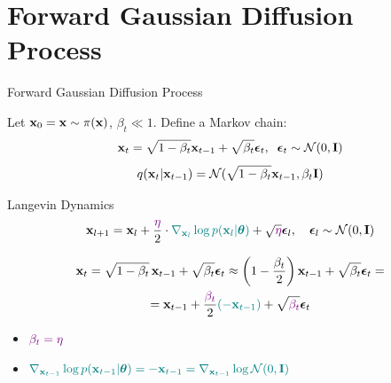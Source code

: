 \documentclass{beamer}
\begin{document}
\section{Forward Gaussian Diffusion Process}
\begin{frame}{Forward Gaussian Diffusion Process}

	Let $\mathbf{x}_0 = \mathbf{x} \sim \pi(\mathbf{x})$, $\beta_t \ll 1$. Define a Markov chain:
	\[
		\mathbf{x}_t = \sqrt{1 - \beta_t} \mathbf{x}_{t-1} + \sqrt{\beta_t} \boldsymbol{\epsilon}_t, \;\; \boldsymbol{\epsilon}_t \sim \mathcal{N}(0, \mathbf{I})
	\]
	\vspace{-0.5cm}
    \eqpause
	\[
		q(\mathbf{x}_t | \mathbf{x}_{t-1}) = \mathcal{N}(\sqrt{1 - \beta_t} \mathbf{x}_{t-1}, \beta_t \mathbf{I})
	\]
    \eqpause
	\vspace{-0.5cm}
	\begin{block}{Langevin Dynamics}
		\vspace{-0.3cm}
		\[
			\mathbf{x}_{l + 1} = \mathbf{x}_l + \frac{ \color{violet} \eta}{2} \cdot {\color{teal}\nabla_{\mathbf{x}_l} \log p(\mathbf{x}_l | \boldsymbol{\theta})} + \sqrt{ \color{violet} \eta} \boldsymbol{\epsilon}_l, \quad \boldsymbol{\epsilon}_l \sim \mathcal{N}(0, \mathbf{I})
		\]
		\vspace{-0.5cm}
	\end{block}
    \eqpause
	\vspace{-0.7cm}
	\begin{multline*}
		\mathbf{x}_t = \sqrt{1 - \beta_t}\, \mathbf{x}_{t - 1} + \sqrt{\beta_t} \boldsymbol{\epsilon}_t \approx \left(1 - \frac{\beta_t}{2}\right)\mathbf{x}_{t-1} + \sqrt{\beta_t} \boldsymbol{\epsilon}_t = \\
		= \mathbf{x}_{t-1} + \frac{ \color{violet}  \beta_t}{2} {\color{teal} ( -\mathbf{x}_{t-1} )} + \sqrt{ \color{violet}  \beta_t} \boldsymbol{\epsilon}_t
	\end{multline*}
    \eqpause
	\vspace{-0.7cm}
	\begin{itemize}
		\item ${\color{violet} \beta_t = \eta }$
		\item ${\color{teal} \nabla_{\mathbf{x}_{t-1}}\log p(\mathbf{x}_{t-1} | \boldsymbol{\theta}) = - \mathbf{x}_{t-1} = \nabla_{\mathbf{x}_{t-1}} \log \mathcal{N}(0, \mathbf{I})}$
	\end{itemize}
 \end{frame}
\end{document}
